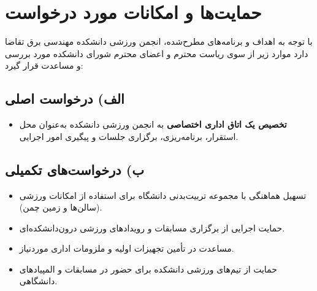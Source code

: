 \documentclass[12pt,a4paper]{article}
\begin{document}
\section{حمایت‌ها و امکانات مورد درخواست}
با توجه به اهداف و برنامه‌های مطرح‌شده، انجمن ورزشی دانشکده مهندسی برق تقاضا دارد موارد زیر از سوی ریاست محترم و اعضای محترم شورای دانشکده مورد بررسی و مساعدت قرار گیرد:

\subsection*{الف) درخواست اصلی}
\begin{itemize}
    \item \textbf{تخصیص یک اتاق اداری اختصاصی} به انجمن ورزشی دانشکده به‌عنوان محل استقرار، برنامه‌ریزی، برگزاری جلسات و پیگیری امور اجرایی.
\end{itemize}

\subsection*{ب) درخواست‌های تکمیلی}
\begin{itemize}
    \item تسهیل هماهنگی با مجموعه تربیت‌بدنی دانشگاه برای استفاده از امکانات ورزشی (سالن‌ها و زمین چمن).
    \item حمایت اجرایی از برگزاری مسابقات و رویدادهای ورزشی درون‌دانشکده‌ای.
    \item مساعدت در تأمین تجهیزات اولیه و ملزومات اداری موردنیاز.
    \item حمایت از تیم‌های ورزشی دانشکده برای حضور در مسابقات و المپیادهای دانشگاهی.
\end{itemize}

\end{document}
